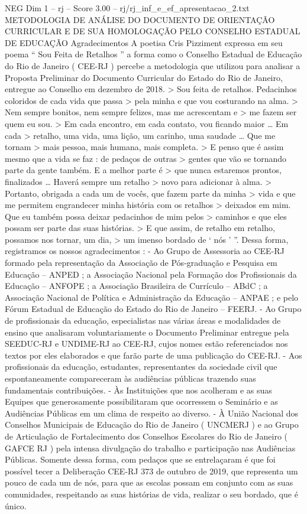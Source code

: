 \begin{textsample}{NEG Dim 1 – rj – Score 3.00 – rj/rj\_inf\_e\_ef\_apresentacao\_2.txt}  \label{ex:f1_neg_004}
METODOLOGIA DE ANÁLISE DO DOCUMENTO DE ORIENTAÇÃO CURRICULAR E DE SUA HOMOLOGAÇÃO PELO CONSELHO ESTADUAL DE EDUCAÇÃO Agradecimentos A poetisa Cris Pizziment expressa em seu poema “ Sou Feita de Retalhos ” a forma como o Conselho Estadual de Educação do Rio de Janeiro ( CEE-RJ ) percebe a metodologia que utilizou para analisar a Proposta Preliminar do Documento Curricular do Estado do Rio de Janeiro, entregue ao Conselho em dezembro de 2018. > Sou feita de retalhos.
Pedacinhos coloridos de cada vida que passa > pela minha e que vou costurando na alma. > Nem sempre bonitos, nem sempre felizes, mas me acrescentam e > me fazem ser quem eu sou. > Em cada encontro, em cada contato, vou ficando maior … Em cada > retalho, uma vida, uma lição, um carinho, uma saudade … Que me tornam > mais pessoa, mais humana, mais completa. > E penso que é assim mesmo que a vida se faz : de pedaços de outras > gentes que vão se tornando parte da gente também.
E a melhor parte é > que nunca estaremos prontos, finalizados … Haverá sempre um retalho > novo para adicionar à alma. > Portanto, obrigada a cada um de vocês, que fazem parte da minha > vida e que me permitem engrandecer minha história com os retalhos > deixados em mim.
Que eu também possa deixar pedacinhos de mim pelos > caminhos e que eles possam ser parte das suas histórias. > E que assim, de retalho em retalho, possamos nos tornar, um dia, > um imenso bordado de ‘ nós ’ ”.
Dessa forma, registramos os nossos agradecimentos : - Ao Grupo de Assessoria ao CEE-RJ formado pela representação da Associação de Pós-graduação e Pesquisa em Educação – ANPED ; a Associação Nacional pela Formação dos Profissionais da Educação – ANFOPE ; a Associação Brasileira de Currículo – ABdC ; a Associação Nacional de Política e Administração da Educação – ANPAE ; e pelo Fórum Estadual de Educação do Estado do Rio de Janeiro – FEERJ. - Ao Grupo de profissionais da educação, especialistas nas várias áreas e modalidades de ensino que analisaram voluntariamente o Documento Preliminar entregue pela SEEDUC-RJ e UNDIME-RJ ao CEE-RJ, cujos nomes estão referenciados nos textos por eles elaborados e que farão parte de uma publicação do CEE-RJ. - Aos profissionais da educação, estudantes, representantes da sociedade civil que espontaneamente compareceram às audiências públicas trazendo suas fundamentais contribuições. - Às Instituições que nos acolheram e as suas Equipes que generosamente possibilitaram que ocorressem o Seminário e as Audiências Públicas em um clima de respeito ao diverso. - À União Nacional dos Conselhos Municipais de Educação do Rio de Janeiro ( UNCMERJ ) e ao Grupo de Articulação de Fortalecimento dos Conselhos Escolares do Rio de Janeiro ( GAFCE RJ ) pela intensa divulgação do trabalho e participação nas Audiências Públicas.
Somente dessa forma, com pedaços que se entrelaçaram é que foi possível tecer a Deliberação CEE-RJ 373 de outubro de 2019, que representa um pouco de cada um de nós, para que as escolas possam em conjunto com as suas comunidades, respeitando as suas histórias de vida, realizar o seu bordado, que é único.

\end{textsample}
